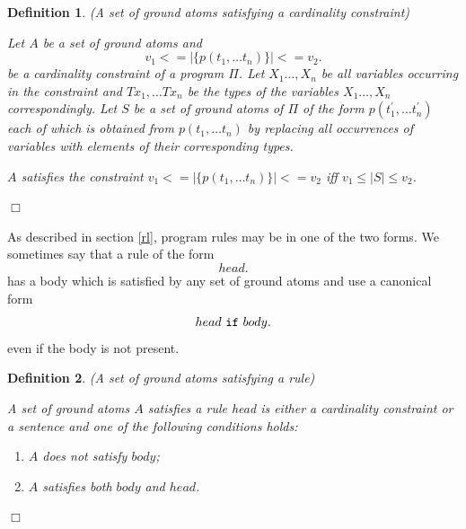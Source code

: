 \documentclass[a4paper,10pt]{article}
\newtheorem{definition}{Definition}
\begin{document}
\begin{definition}(A set of ground atoms satisfying a cardinality constraint)\\
\rm{
Let $A$ be a set of ground atoms and $$v_1 <= |\{p(t_1,\ldots t_n)\}| <= v_2.$$ be a cardinality constraint of a program $\Pi$.
Let $X_1\ldots,X_n$ be all variables occurring in the constraint and $Tx_1,\ldots Tx_n$ be the types of the variables $X_1\ldots,X_n$ correspondingly. Let $S$ be a set of ground atoms of $\Pi$ of the form $p(t_1^\prime,\ldots t_n^\prime)$ each of which is obtained from $p(t_1,\ldots t_n)$ by replacing all occurrences of variables  with elements of their corresponding types.

\noindent\medskip
$A$ satisfies  the constraint $v_1 <= |\{p(t_1,\ldots t_n)\}| <= v_2$ iff $v_1 \le |S| \le v_2$. 

\hfill$\Box$

}
\end{definition}


As described in section \ref{rl}, program rules may be in one of the two forms. We sometimes say that a rule of the form $$head.$$ has a body which is satisfied by any set of ground atoms and use a canonical form $$head~\mbox{\texttt{if}}~body.$$ even if the body is not present.



\begin{definition}(A set of ground atoms satisfying a rule)\\
\rm{
A set of ground atoms $A$ satisfies a rule 
 head is either a cardinality constraint or a sentence and one of the following conditions holds:
\begin{enumerate}
\item $A$ does not satisfy $body$;
\item $A$ satisfies both $body$ and $head$.
\end{enumerate}
}
\hfill $\Box$
\end{definition}
\end{document}
